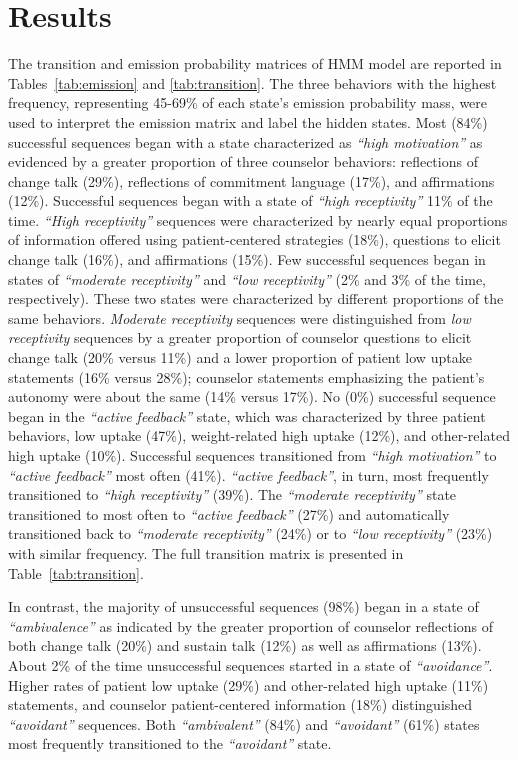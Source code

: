 \section{Results}
\label{sec:results}
The transition and emission probability matrices of HMM model are reported in Tables~\ref{tab:emission} and \ref{tab:transition}. The three behaviors with the highest frequency, representing 45-69\% of each state’s emission probability mass, were used to interpret the emission matrix and label the hidden states. Most (84\%) successful sequences began with a state characterized as \textit{``high motivation''} as evidenced by a greater proportion of three counselor behaviors: reflections of change talk (29\%), reflections of commitment language (17\%), and affirmations (12\%). Successful sequences began with a state of \textit{``high receptivity''} 11\% of the time. \textit{``High receptivity''} sequences were characterized by nearly equal proportions of information offered using patient-centered strategies (18\%), questions to elicit change talk (16\%), and affirmations (15\%). Few successful sequences began in states of \textit{``moderate receptivity''} and \textit{``low receptivity''} (2\% and 3\% of the time, respectively). These two states were characterized by different proportions of the same behaviors. \textit{Moderate receptivity} sequences were distinguished from \textit{low receptivity} sequences by a greater proportion of counselor questions to elicit change talk (20\% versus 11\%) and a lower proportion of patient low uptake statements (16\% versus 28\%); counselor statements emphasizing the patient’s autonomy were about the same (14\% versus 17\%). No (0\%) successful sequence began in the \textit{``active feedback''} state, which was characterized by three patient behaviors, low uptake (47\%), weight-related high uptake (12\%), and other-related high uptake (10\%). Successful sequences transitioned from \textit{``high motivation''} to \textit{``active feedback''} most often (41\%). \textit{``active feedback''}, in turn, most frequently transitioned to \textit{``high receptivity''} (39\%). The \textit{``moderate receptivity''} state transitioned to most often to \textit{``active feedback''} (27\%) and automatically transitioned back to \textit{``moderate receptivity''} (24\%) or to \textit{``low receptivity''} (23\%) with similar frequency. The full transition matrix is presented in Table~\ref{tab:transition}.

In contrast, the majority of unsuccessful sequences (98\%) began in a state of \textit{``ambivalence''} as indicated by the greater proportion of counselor reflections of both change talk (20\%) and sustain talk (12\%) as well as affirmations (13\%). About 2\% of the time unsuccessful sequences started in a state of \textit{``avoidance''}. Higher rates of patient low uptake (29\%) and other-related high uptake (11\%) statements, and counselor patient-centered information (18\%) distinguished \textit{``avoidant''} sequences. Both \textit{``ambivalent''} (84\%) and \textit{``avoidant''} (61\%) states most frequently transitioned to the \textit{``avoidant''} state.

